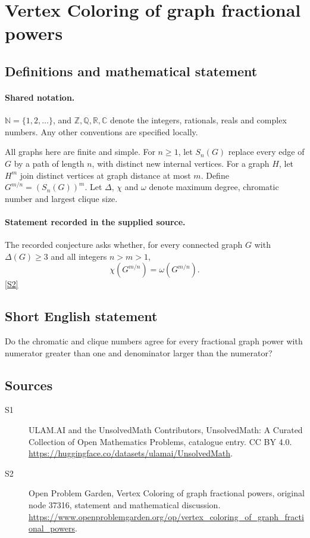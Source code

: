 \documentclass[11pt]{article}
\newcommand{\sref}[2]{\hyperlink{source:#1:#2}{[S#2]}}
\begin{document}
\section{Vertex Coloring of graph fractional powers}\label{statement}

\subsection{Definitions and mathematical statement}

\paragraph{Shared notation.}$\mathbb N=\{1,2,\ldots\}$, and $\mathbb Z,\mathbb Q,\mathbb R,\mathbb C$ denote the integers, rationals, reals and complex numbers. Any other conventions are specified locally.


All graphs here are finite and simple. For $n\ge1$, let $S_n(G)$ replace every edge of $G$ by a path of length $n$, with distinct new internal vertices. For a graph $H$, let $H^m$ join distinct vertices at graph distance at most $m$. Define $G^{m/n}=(S_n(G))^m$. Let $\Delta$, $\chi$ and $\omega$ denote maximum degree, chromatic number and largest clique size.
\paragraph{Statement recorded in the supplied source.}
The recorded conjecture asks whether, for every connected graph $G$ with $\Delta(G)\ge3$ and all integers $n>m>1$, \[\chi(G^{m/n})=\omega(G^{m/n}).\] \sref{statement}{2}
\subsection{Short English statement}
Do the chromatic and clique numbers agree for every fractional graph power with numerator greater than one and denominator larger than the numerator?
\subsection{Sources}
\begin{description}
\item[\hypertarget{source:statement:1}{S1}] ULAM.AI and the UnsolvedMath Contributors, UnsolvedMath: A Curated Collection of Open Mathematics Problems, catalogue entry. CC BY 4.0. \url{https://huggingface.co/datasets/ulamai/UnsolvedMath}.
\item[\hypertarget{source:statement:2}{S2}] Open Problem Garden, Vertex Coloring of graph fractional powers, original node 37316, statement and mathematical discussion. \url{https://www.openproblemgarden.org/op/vertex_coloring_of_graph_fractional_powers}.
\end{description}
\label{end:statement}
\end{document}
